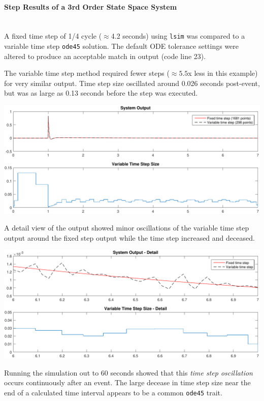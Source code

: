 \documentclass[12pt]{article}
\begin{document}
\onehalfspacing
\paragraph{Step Results of a 3rd Order State Space System} \ \\
A fixed time step of 1/4 cycle ($\approx$4.2 seconds) using \verb|lsim| was compared to a variable time step \verb|ode45| solution.
The default ODE tolerance settings were altered to produce an acceptable match in output (code line 23).

The variable time step method required fewer steps ($\approx 5.5$x less in this example) for very similar output.
Time step size oscillated around 0.026 seconds post-event, but was as large as 0.13 seconds before the step was executed.

\includegraphics[width=\linewidth]{step}

A detail view of the output showed minor oscillations of the variable time step output around the fixed step output while the time step increased and deceased.

\includegraphics[width=\linewidth]{stepDetail}

\pagebreak
Running the simulation out to 60 seconds showed that this \emph{time step oscillation} occurs continuously after an event.
The large decease in time step size near the end of a calculated time interval appears to be a common \verb|ode45| trait.
\end{document}
